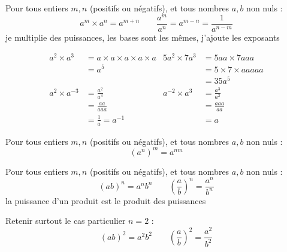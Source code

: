 \documentclass[main.tex]{subfiles}
\begin{document}
\begin{theorem}
	Pour tous entiers $m, n$ (positifs ou négatifs), et tous nombres $a, b$ non nuls : 
	$$
	a^m\times a^n   =a^{m+n}  \qquad 
	\frac{a^m}{a^n}   = a^{m-n} =\frac{1}{a^{n-m}}  
	$$
	\og je multiplie des puissances, les bases sont les mêmes, j'ajoute les exposants \fg{} 
\end{theorem}
\begin{example}\hfill 
	\begin{align*}
		a^2 \times a^3 &= a\times a \times a \times a \times a & 5a^2 \times 7a^3& = 5aa \times 7 aaa \\
		& =a^5 & & = 5\times 7\times aaaaa\\
		&&& =35 a^5 \\
		a^2\times a^{-3}& = \frac{a^2}{a^3}  & a^{-2}\times a^3 & = \frac{a^3}{a^2} \\
		& = \frac{aa}{aaa} && = \frac{aaa}{aa} \\
		& = \frac{1}{a}=a^{-1} && =a
	\end{align*}
\end{example} 
\begin{theorem}
	Pour tous entiers $m, n$ (positifs ou négatifs), et tous nombres $a, b$ non nuls : 
	$$
	(a^n )^m  = a^{nm} 
	$$ 
\end{theorem}

\begin{theorem}
	Pour tous entiers $m, n$ (positifs ou négatifs), et tous nombres $a, b$ non nuls :
	$$
	(ab)^n = a^n b^n \qquad  \left(\frac{a}{b}\right)^n  = \frac{a^n}{b^n}
	$$
	\og la puissance d'un produit est le produit des puissances \fg{} 
\end{theorem}
\begin{remark}
	Retenir surtout le cas particulier $n=2$ :
	$$
	(ab)^2 = a^2 b^2 \qquad  \left(\frac{a}{b}\right)^2  = \frac{a^2}{b^2}
	$$
\end{remark}



\newpage 
{}  
\pagestyle{scrheadings} %
\onehalfspacing
\end{document}
